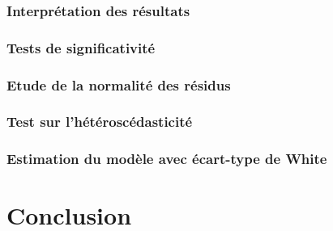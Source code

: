\documentclass[]{article}
\begin{document}
\subsubsection{Interprétation des résultats}
\subsubsection{Tests de significativité}
\subsubsection{Etude de la normalité des résidus}
\subsubsection{Test sur l'hétéroscédasticité}
\subsubsection{Estimation du modèle avec écart-type de White}
\section{Conclusion}
\end{document}
